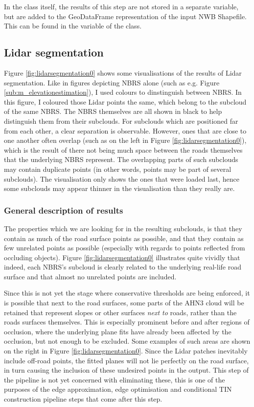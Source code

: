 In the class itself, the results of this step are not stored in a separate variable, but are added to the GeoDataFrame representation of the input NWB Shapefile. This can be found in the  variable of the  class.

\subsection{Lidar segmentation}
\label{sub:r_lidarsegmentation}

Figure \ref{fig:lidarsegmentation0} shows some visualisations of the results of Lidar segmentation. Like in figures depicting NBRS alone (such as e.g. Figure \ref{sub:m_elevationestimation}), I used colours to dinstinguish between NBRS. In this figure, I coloured those Lidar points the same, which belong to the subcloud of the same NBRS. The NBRS themselves are all shown in black to help distinguish them from their subclouds. For subclouds which are positioned far from each other, a clear separation is observable. However, ones that are close to one another often overlap (such as on the left in Figure \ref{fig:lidarsegmentation0}), which is the result of there not being much space between the roads themselves that the underlying NBRS represent. The overlapping parts of such subclouds may contain duplicate points (in other words, points may be part of several subclouds). The visualisation only shows the ones that were loaded last, hence some subclouds may appear thinner in the visualisation than they really are.

\subsubsection{General description of results}

The properties which we are looking for in the resulting subclouds, is that they contain as much of the road surface points as possible, and that they contain as few unrelated points as possible (especially with regards to points reflected from occluding objects). Figure \ref{fig:lidarsegmentation0} illustrates quite vividly that indeed, each NBRS's subcloud is clearly related to the underlying real-life road surface and that almost no unrelated points are included.

Since this is not yet the stage where conservative thresholds are being enforced, it is possible that next to the road surfaces, some parts of the AHN3 cloud will be retained that represent slopes or other surfaces \textit{next to} roads, rather than the roads surfaces themselves. This is especially prominent before and after regions of occlusion, where the underlying plane fits have already been affected by the occlusion, but not enough to be excluded. Some examples of such areas are shown on the right in Figure \ref{fig:lidarsegmentation0}. Since the Lidar patches inevitably include off-road points, the fitted planes will not lie perfectly on the road surface, in turn causing the inclusion of these undesired points in the output. This step of the pipeline is not yet concerned with eliminating these, this is one of the purposes of the edge approximation, edge optimisation and conditional TIN construction pipeline steps that come after this step.


